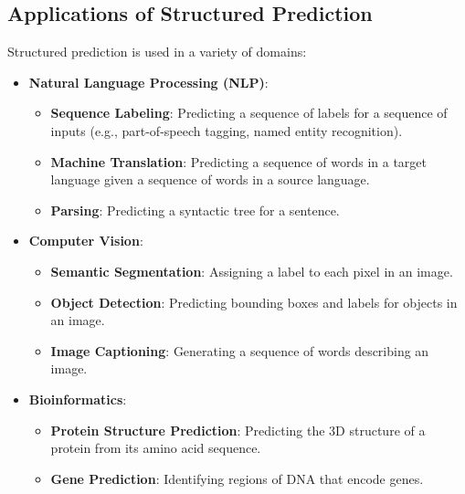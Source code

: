 \begin{notechapter}
\section{Applications of Structured Prediction}
Structured prediction is used in a variety of domains:
\begin{itemize}
  \item \textbf{Natural Language Processing (NLP)}:
    \begin{itemize}
      \item \textbf{Sequence Labeling}: Predicting a sequence of labels 
        for a sequence of inputs (e.g., part-of-speech tagging, named 
        entity recognition).
      \item \textbf{Machine Translation}: Predicting a sequence of 
        words in a target language given a sequence of words in a 
        source language.
      \item \textbf{Parsing}: Predicting a syntactic tree for a 
        sentence.
    \end{itemize}
  \item \textbf{Computer Vision}:
    \begin{itemize}
      \item \textbf{Semantic Segmentation}: Assigning a label to each 
        pixel in an image.
      \item \textbf{Object Detection}: Predicting bounding boxes and 
        labels for objects in an image.
      \item \textbf{Image Captioning}: Generating a sequence of words 
        describing an image.
    \end{itemize}
  \item \textbf{Bioinformatics}:
    \begin{itemize}
      \item \textbf{Protein Structure Prediction}: Predicting the 3D 
        structure of a protein from its amino acid sequence.
      \item \textbf{Gene Prediction}: Identifying regions of DNA that 
        encode genes.
    \end{itemize}
\end{itemize}


\end{notechapter}
